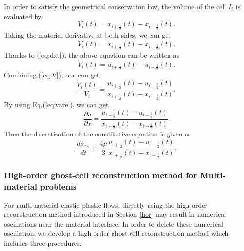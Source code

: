 \documentclass[review]{elsarticle}
\begin{document}
In order to satisfy the geometrical conservation law, the volume of the cell $I_i$ is evaluated by
\begin{equation}\label{eq:V}
  V_i(t) = x_{i+\frac{1}{2}}(t) - x_{i-\frac{1}{2}}(t).
\end{equation}
Taking the material derivative at both sides, we can get
\begin{equation}\label{eq:dotV}
  \dot{V}_i(t) = \dot{x}_{i+\frac{1}{2}}(t) - \dot{x}_{i-\frac{1}{2}}(t).
\end{equation}
Thanks to (\ref{eq:dxt}), the above equation can be written as
\begin{equation}\label{eq:dotV}
  \dot{V}_i(t) = u_{i+\frac{1}{2}}(t) - u_{i-\frac{1}{2}}(t).
\end{equation}
Combining (\ref{eq:V}), one can get
\begin{equation}
  \frac{\dot{V}_i(t)}{V_i} =\frac{ u_{i+\frac{1}{2}}(t) - u_{i-\frac{1}{2}}(t)}{ x_{i+\frac{1}{2}}(t) - x_{i-\frac{1}{2}}(t)},
\end{equation}
By using Eq.(\ref{eq:vare}), we can get
\begin{equation}
  \frac{\partial u}{\partial x} =\frac{ u_{i+\frac{1}{2}}(t) - u_{i-\frac{1}{2}}(t)}{ x_{i+\frac{1}{2}}(t) - x_{i-\frac{1}{2}}(t)}.
\end{equation}
Then  the  discretization of the constitutive equation is given as
\begin{equation}\label{eq:semSxx}
  \frac{d s_{xx}}{dt } =\frac{4\mu}{3} \frac{ u_{i+\frac{1}{2}}(t) - u_{i-\frac{1}{2}}(t)}{ x_{i+\frac{1}{2}}(t) - x_{i-\frac{1}{2}}(t)}.
\end{equation}


\subsubsection{High-order ghost-cell reconstruction method for Multi-material problems} \label{sec:ghostcell}

For multi-material elastic-plastic flows, directly using the high-order reconstruction method introduced in  Section \ref{hor} may result in numerical oscillations near the material interface. In order to delete these numerical oscillation, we develop a high-order ghost-cell reconstruction method which includes three procedures.
\end{document}
